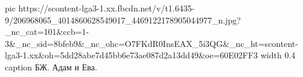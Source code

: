  
 
 
 
 
\ifcmt
  pic https://scontent-lga3-1.xx.fbcdn.net/v/t1.6435-9/206968065_4014860628549017_4469122178905044977_n.jpg?_nc_cat=101&ccb=1-3&_nc_sid=8bfeb9&_nc_ohc=O7FKdR0InsEAX_5i3QG&_nc_ht=scontent-lga3-1.xx&oh=5dd28abe7d45bb6e73ae087d2a13dd49&oe=60E02FF3
  width 0.4
	caption БЖ. Адам и Ева.
\fi
